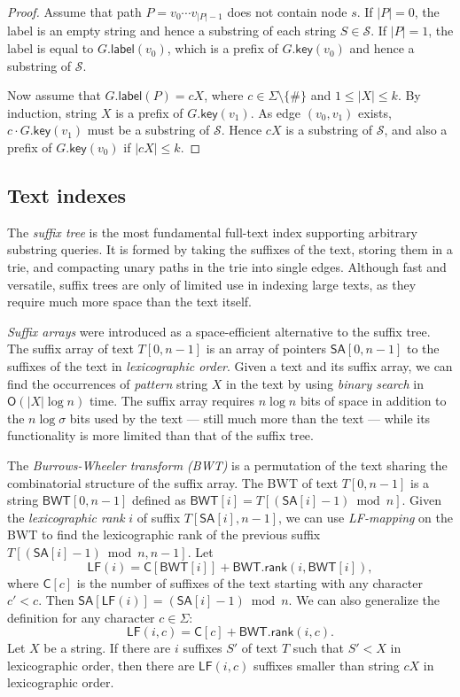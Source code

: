 \documentclass[a4paper,UKenglish]{lipics-v2016}
\newcommand{\set}[1]{\ensuremath{\{ #1 \}}}
\newcommand{\abs}[1]{\ensuremath{\lvert #1 \rvert}}
\newcommand{\Oh}[1]{\ensuremath{\mathsf{O}\!\left( #1 \right)}}
\newcommand{\rank}{\ensuremath{\mathsf{rank}}}
\newcommand{\LF}{\ensuremath{\mathsf{LF}}}
\newcommand{\glabel}{\ensuremath{\mathsf{label}}}
\newcommand{\gkey}{\ensuremath{\mathsf{key}}}
\newcommand{\LFmapping}{LF\nobreakdash-mapping}
\newcommand{\SA}{\ensuremath{\mathsf{SA}}}
\newcommand{\BWT}{\ensuremath{\mathsf{BWT}}}
\newcommand{\Carray}{\ensuremath{\mathsf{C}}}
\begin{document}
\begin{proof}
Assume that path $P = v_{0} \dotsm v_{\abs{P}-1}$ does not contain node $s$. If $\abs{P} = 0$, the label is an empty string and hence a substring of each string $S \in \mathcal{S}$. If $\abs{P} = 1$, the label is equal to $G.\glabel(v_{0})$, which is a prefix of $G.\gkey(v_{0})$ and hence a substring of $\mathcal{S}$.

Now assume that $G.\glabel(P) = cX$, where $c \in \Sigma \setminus \set{\#}$ and $1 \le \abs{X} \le k$. By induction, string $X$ is a prefix of $G.\gkey(v_{1})$. As edge $(v_{0}, v_{1})$ exists, $c \cdot G.\gkey(v_{1})$ must be a substring of $\mathcal{S}$. Hence $cX$ is a substring of $\mathcal{S}$, and also a prefix of $G.\gkey(v_{0})$ if $\abs{cX} \le k$.
\end{proof}

\subsection{Text indexes}

The \emph{suffix tree} \cite{Weiner1973} is the most fundamental full-text index supporting arbitrary substring queries. It is formed by taking the suffixes of the text, storing them in a trie, and compacting unary paths in the trie into single edges. Although fast and versatile, suffix trees are only of limited use in indexing large texts, as they require much more space than the text itself.

\emph{Suffix arrays} \cite{Manber1993} were introduced as a space-efficient alternative to the suffix tree. The suffix array of text $T[0, n-1]$ is an array of pointers $\SA[0, n-1]$ to the suffixes of the text in \emph{lexicographic order}. Given a text and its suffix array, we can find the occurrences of \emph{pattern} string $X$ in the text by using \emph{binary search} in $\Oh{\abs{X} \log n}$ time. The suffix array requires $n \log n$ bits of space in addition to the $n \log \sigma$ bits used by the text --- still much more than the text --- while its functionality is more limited than that of the suffix tree.

The \emph{Burrows-Wheeler transform (BWT)} \cite{Burrows1994} is a permutation of the text sharing the combinatorial structure of the suffix array. The BWT of text $T[0, n-1]$ is a string $\BWT[0, n-1]$ defined as $\BWT[i] = T[(\SA[i]-1) \bmod n]$. Given the \emph{lexicographic rank} $i$ of suffix $T[\SA[i], n-1]$, we can use \emph{\LFmapping} on the BWT to find the lexicographic rank of the previous suffix $T[(\SA[i]-1) \bmod n, n-1]$. Let
$$
\LF(i) = \Carray[\BWT[i]] + \BWT.\rank(i, \BWT[i]),
$$
where $\Carray[c]$ is the number of suffixes of the text starting with any character $c' < c$. Then $\SA[\LF(i)] = (\SA[i]-1) \bmod n$. We can also generalize the definition for any character $c \in \Sigma$:
$$
\LF(i, c) = \Carray[c] + \BWT.\rank(i, c).
$$
Let $X$ be a string. If there are $i$ suffixes $S'$ of text $T$ such that $S' < X$ in lexicographic order, then there are $\LF(i, c)$ suffixes smaller than string $cX$ in lexicographic order.
\end{document}
